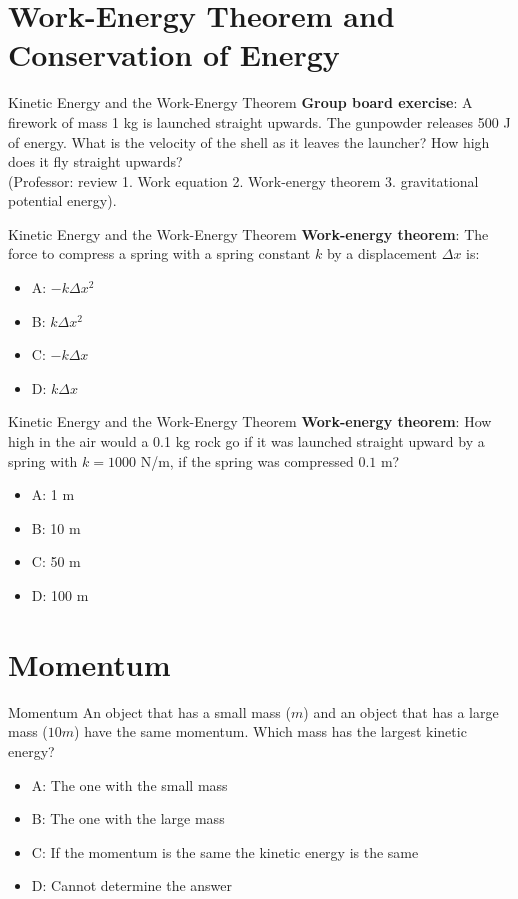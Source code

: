 \documentclass{beamer}
\begin{document}
\section{Work-Energy Theorem and Conservation of Energy}

\begin{frame}{Kinetic Energy and the Work-Energy Theorem}
\textbf{Group board exercise}: A firework of mass 1 kg is launched straight upwards.  The gunpowder releases 500 J of energy.  What is the velocity of the shell as it leaves the launcher?  How high does it fly straight upwards? \\ \vspace{0.5cm}
(Professor: review 1. Work equation 2. Work-energy theorem 3. gravitational potential energy).
\end{frame}

\begin{frame}{Kinetic Energy and the Work-Energy Theorem}
\textbf{Work-energy theorem}: The force to compress a spring with a spring constant $k$ by a displacement $\Delta x$ is:
\begin{itemize}
\item A: $-k \Delta x^2$
\item B: $k \Delta x^2$
\item C: $-k \Delta x$
\item D: $k \Delta x$
\end{itemize}
\end{frame}

\begin{frame}{Kinetic Energy and the Work-Energy Theorem}
\textbf{Work-energy theorem}: How high in the air would a 0.1 kg rock go if it was launched straight upward by a spring with $k=1000$ N/m, if the spring was compressed $0.1$ m?
\begin{itemize}
\item A: 1 m
\item B: 10 m
\item C: 50 m
\item D: 100 m
\end{itemize}
\end{frame}

\section{Momentum}

\begin{frame}{Momentum}
An object that has a small mass ($m$) and an object that has a large mass ($10m$) have the same momentum. Which mass has the largest kinetic energy?
\begin{itemize}
\item A: The one with the small mass
\item B: The one with the large mass
\item C: If the momentum is the same the kinetic energy is the same
\item D: Cannot determine the answer
\end{itemize}
\end{frame}
\end{document}
